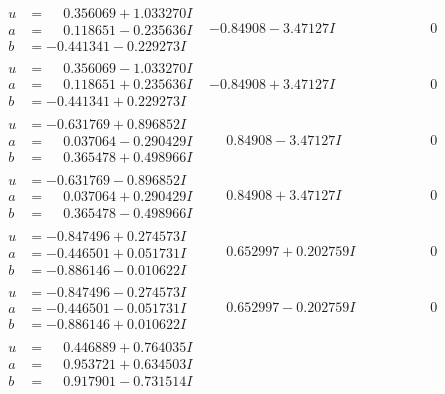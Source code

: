 \documentclass[1p]{elsarticle_modified}
\theoremstyle{definition}
\begin{document}
$$\begin{array}{c|c|c}
\begin{aligned}
u &= \phantom{-}0.356069 + 1.033270 I \\
a &= \phantom{-}0.118651 - 0.235636 I \\
b &= -0.441341 - 0.229273 I\end{aligned}
 & -0.84908 - 3.47127 I & \phantom{-0.000000 } 0 \\ \hline\begin{aligned}
u &= \phantom{-}0.356069 - 1.033270 I \\
a &= \phantom{-}0.118651 + 0.235636 I \\
b &= -0.441341 + 0.229273 I\end{aligned}
 & -0.84908 + 3.47127 I & \phantom{-0.000000 } 0 \\ \hline\begin{aligned}
u &= -0.631769 + 0.896852 I \\
a &= \phantom{-}0.037064 - 0.290429 I \\
b &= \phantom{-}0.365478 + 0.498966 I\end{aligned}
 & \phantom{-}0.84908 - 3.47127 I & \phantom{-0.000000 } 0 \\ \hline\begin{aligned}
u &= -0.631769 - 0.896852 I \\
a &= \phantom{-}0.037064 + 0.290429 I \\
b &= \phantom{-}0.365478 - 0.498966 I\end{aligned}
 & \phantom{-}0.84908 + 3.47127 I & \phantom{-0.000000 } 0 \\ \hline\begin{aligned}
u &= -0.847496 + 0.274573 I \\
a &= -0.446501 + 0.051731 I \\
b &= -0.886146 - 0.010622 I\end{aligned}
 & \phantom{-}0.652997 + 0.202759 I & \phantom{-0.000000 } 0 \\ \hline\begin{aligned}
u &= -0.847496 - 0.274573 I \\
a &= -0.446501 - 0.051731 I \\
b &= -0.886146 + 0.010622 I\end{aligned}
 & \phantom{-}0.652997 - 0.202759 I & \phantom{-0.000000 } 0 \\ \hline\begin{aligned}
u &= \phantom{-}0.446889 + 0.764035 I \\
a &= \phantom{-}0.953721 + 0.634503 I \\
b &= \phantom{-}0.917901 - 0.731514 I\end{aligned}

\end{array}$$
\end{document}
